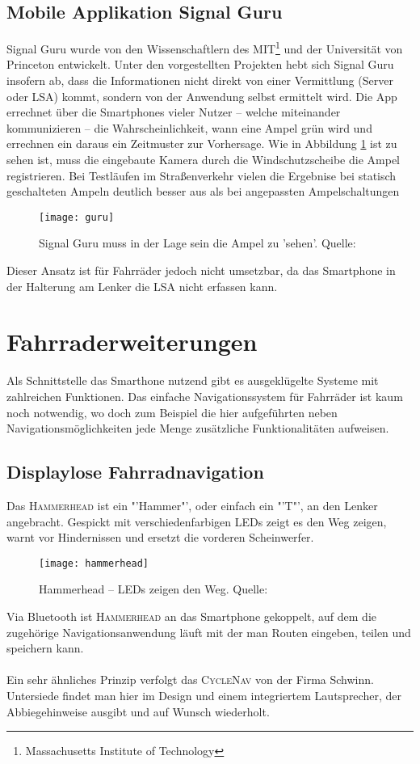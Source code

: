 \subsection*{Mobile Applikation Signal Guru}
Signal Guru wurde von den Wissenschaftlern des MIT\footnote{ Massachusetts Institute of Technology} und der Universität von Princeton entwickelt. Unter den vorgestellten Projekten hebt sich Signal Guru insofern ab, dass die Informationen nicht direkt von einer Vermittlung (Server oder \gls{LSA}) kommt, sondern von der Anwendung selbst ermittelt wird. Die \Gls{App} errechnet über die \glspl{Smartphone} vieler Nutzer -- welche miteinander kommunizieren -- die Wahrscheinlichkeit, wann eine Ampel grün wird und errechnen ein daraus ein Zeitmuster zur Vorhersage. Wie in Abbildung \ref{fig:AppSignalGuru} ist zu sehen ist, muss die eingebaute Kamera durch die Windschutzscheibe die Ampel registrieren. Bei Testläufen im Straßenverkehr vielen die Ergebnise bei statisch geschalteten Ampeln deutlich besser aus als bei angepassten Ampelschaltungen \cite{SignalGuruPaper} 
\begin{figure}[H]
    \centering
    \texttt{[image: guru]}
    \caption[Signal Guru]{Signal Guru muss in der Lage sein die Ampel zu 'sehen'.  Quelle: \cite{SignalGuruPaper}} \label{fig:AppSignalGuru}
\end{figure}
Dieser Ansatz ist für Fahrräder jedoch nicht umsetzbar, da das \gls{Smartphone} in der Halterung am Lenker die \gls{LSA} nicht erfassen kann.
\section{Fahrraderweiterungen}
Als Schnittstelle das Smarthone nutzend gibt es ausgeklügelte Systeme mit zahlreichen Funktionen. Das einfache Navigationssystem für Fahrräder ist kaum noch notwendig, wo doch zum Beispiel die hier aufgeführten neben Navigationsmöglichkeiten jede Menge zusätzliche Funktionalitäten aufweisen.
\subsection{Displaylose Fahrradnavigation}
Das \textsc{Hammerhead} ist ein "'Hammer"', oder einfach ein "'T"', an den Lenker angebracht. Gespickt mit verschiedenfarbigen \glspl{LED} zeigt es den Weg zeigen, warnt vor Hindernissen und ersetzt die vorderen Scheinwerfer.
\begin{figure}[H]
    \centering
    \texttt{[image: hammerhead]}
    \caption[Hammerhead]{Hammerhead -- \glspl{LED} zeigen den Weg.  Quelle: \cite{Hammerhead}} 
    \label{fig:hammerhead}
\end{figure}
Via Bluetooth ist \textsc{Hammerhead} an das \gls{Smartphone} gekoppelt, auf dem die zugehörige Navigationsanwendung läuft mit der man Routen eingeben, teilen und speichern kann\cite{Hammerhead}.\\\\
Ein sehr ähnliches Prinzip verfolgt das \textsc{CycleNav} von der Firma Schwinn. Untersiede findet man hier im Design und einem integriertem Lautsprecher, der Abbiegehinweise ausgibt und auf Wunsch wiederholt\cite{CycleNav}.
